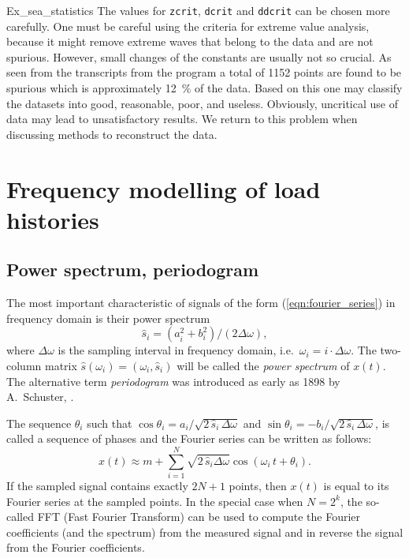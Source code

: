 \begin{cex}{Ex_sea_statistics}
The values for {\tt zcrit}, {\tt dcrit} and  {\tt ddcrit}
can be chosen more carefully. One must be careful using the
criteria for extreme value analysis, because
it might remove extreme waves that belong to the data and
are not spurious. However, small changes of the
constants are usually not so crucial. As seen from the
transcripts from the program a total of 1152 points are
found to be spurious which is approximately 12~\% of the data.
Based on this one may classify the datasets into good,
reasonable, poor, and useless. Obviously, uncritical use of
data may lead to unsatisfactory results. We return to this
problem when discussing methods to reconstruct the data.
\end{cex}

\section{Frequency modelling of load histories}
\label{sec:freq-model-load}

\subsection{Power spectrum, periodogram}\label{powerspectrum}
The most important characteristic of signals
of the form (\ref{eqn:fourier_series})
in frequency domain is their power
spectrum  
$$\hat{s}_i=(a_i^2+b_i^2)/(2\Delta\omega),$$
where $\Delta\omega$ is the sampling interval in frequency
domain, i.e.\ $\omega_i=i\cdot \Delta\omega$.
The two-column matrix $\hat{s}(\omega_i)=(\omega_i,\hat{s}_i)$
will be called the {\it power spectrum} of $x(t)$. The alternative term
{\it periodogram} was introduced as early as 1898 by A.\ Schuster,
\cite{Schuster}. 

The sequence $\theta_i$ such that
$\cos \theta_i = a_i/\sqrt{2\, \hat{s}_i\, \Delta\omega}$ and
$\sin \theta_i = - b_i/\sqrt{2\, \hat{s}_i\, \Delta\omega}$,
is called a sequence of
phases and the Fourier series can be written as follows:
$$
x(t)\approx m + \sum_{i=1}^N \sqrt{2\, \hat{s}_i\Delta\omega}
\cos(\omega_i\,t+\theta_i).
$$
If the sampled signal contains
exactly $2N+1$ points, then $x(t)$ is equal to its Fourier series at the
sampled points. In the special case when $N=2^k$, the so-called FFT
(Fast Fourier Transform) can be used to compute the Fourier
coefficients (and the spectrum) from the measured signal and in
reverse the signal from the Fourier coefficients.

